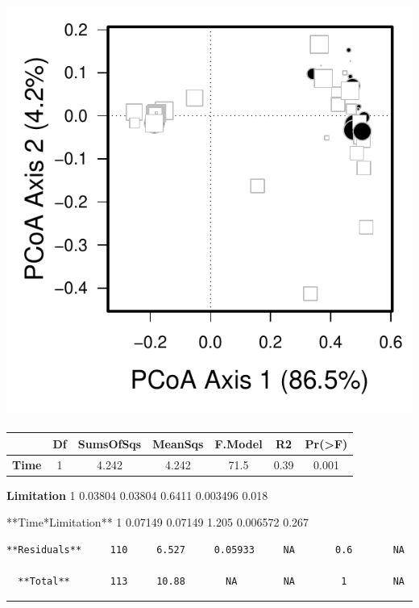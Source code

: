 \documentclass[]{article}
\begin{document}
\subsection{\texorpdfstring{\protect\includegraphics{analysis_ecoevostoich_files/figure-latex/unnamed-chunk-29-1.pdf}}{}}\label{section}

\begin{longtable}[]{@{}ccccccc@{}}
\toprule
~ & Df & SumsOfSqs & MeanSqs & F.Model & R2 &
Pr(\textgreater{}F)\tabularnewline
\midrule
\endhead
\textbf{Time} & 1 & 4.242 & 4.242 & 71.5 & 0.39 & 0.001\tabularnewline
\bottomrule
\end{longtable}

\textbf{Limitation} 1 0.03804 0.03804 0.6411 0.003496 0.018

**Time*Limitation** 1 0.07149 0.07149 1.205 0.006572 0.267

\begin{verbatim}
**Residuals**     110     6.527     0.05933     NA       0.6       NA   

  **Total**       113     10.88       NA        NA        1        NA   
\end{verbatim}

\begin{center}\rule{0.5\linewidth}{\linethickness}\end{center}
\end{document}
